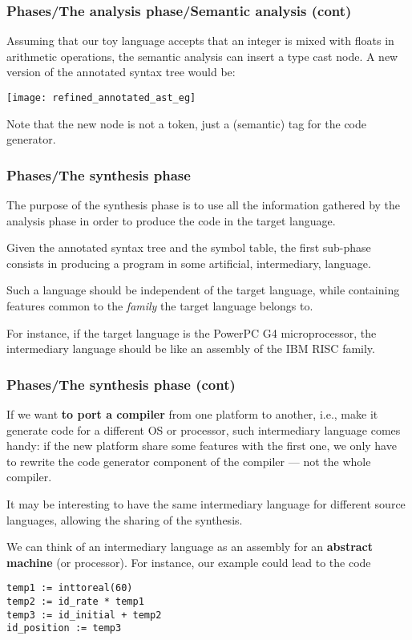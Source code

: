 % 
\begin{frame}
\frametitle{Phases/The analysis phase/Semantic
  analysis (cont)}

Assuming that our toy language accepts that an integer is mixed with
floats in arithmetic operations, the semantic analysis can insert a
type cast node. A new version of the annotated syntax tree would be:
\begin{center}
\texttt{[image: refined\_annotated\_ast\_eg]}
\end{center}
Note that the new node is not a token, just a (semantic) tag for the
code generator.

\end{frame}

% 
\begin{frame}
\frametitle{Phases/The synthesis phase}

The purpose of the synthesis phase is to use all the information
gathered by the analysis phase in order to produce the code in the
target language.

\bigskip

Given the annotated syntax tree and the symbol table, the first
sub-phase consists in producing a program in some artificial,
intermediary, language. 

\bigskip

Such a language should be independent of the target language, while
containing features common to the \emph{family} the target language
belongs to. 

\bigskip

For instance, if the target language is the PowerPC G4 microprocessor,
the intermediary language should be like an assembly of the IBM RISC
family.

\end{frame}

% 
\begin{frame}[containsverbatim]
\frametitle{Phases/The synthesis phase (cont)}

If we want \textbf{to port a compiler} from one platform to another,
i.e., make it generate code for a different OS or processor, such
intermediary language comes handy: if the new platform share some
features with the first one, we only have to rewrite the code
generator component of the compiler --- not the whole compiler.

\bigskip

It may be interesting to have the same intermediary language for
different source languages, allowing the sharing of the synthesis.

\bigskip

We can think of an intermediary language as an assembly for an
\textbf{abstract machine} (or processor). For instance, our example
could lead to the code
{\small
\begin{verbatim}
temp1 := inttoreal(60)
temp2 := id_rate * temp1
temp3 := id_initial + temp2
id_position := temp3
\end{verbatim}
}
\end{frame}

